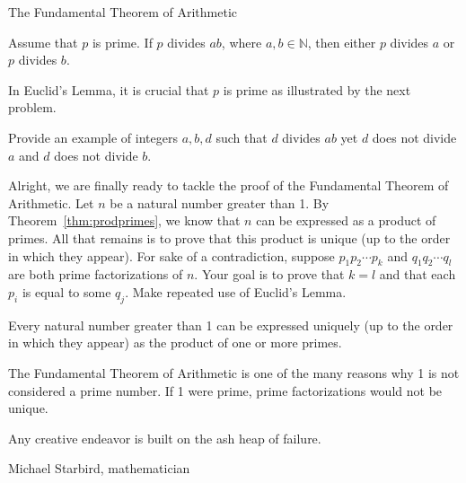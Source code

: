 \begin{section}{The Fundamental Theorem of Arithmetic}
\begin{theorem}\label{thm:Euclid}
Assume that $p$ is prime.  If $p$ divides $ab$, where $a,b\in\mathbb{N}$, then either $p$ divides $a$ or $p$ divides $b$.
\end{theorem}

In Euclid's Lemma, it is crucial that $p$ is prime as illustrated by the next problem.

\begin{problem}
Provide an example of integers $a, b, d$ such that $d$ divides $ab$ yet $d$ does not divide $a$ and $d$ does not divide $b$.
\end{problem}

Alright, we are finally ready to tackle the proof of the Fundamental Theorem of Arithmetic. Let $n$ be a natural number greater than 1. By Theorem~\ref{thm:prodprimes}, we know that $n$ can be expressed as a product of primes.  All that remains is to prove that this product is unique (up to the order in which they appear). For sake of a contradiction, suppose $p_1 p_2 \cdots p_k$ and $q_1 q_2 \cdots q_l$ are both prime factorizations of $n$.  Your goal is to prove that $k=l$ and that each $p_i$ is equal to some $q_j$. Make repeated use of Euclid's Lemma.

\begin{theorem}\label{thm:FTA}
Every natural number greater than 1 can be expressed uniquely (up to the order in which they appear) as the product of one or more primes.
\end{theorem}

The Fundamental Theorem of Arithmetic is one of the many reasons why 1 is not considered a prime number. If 1 were prime, prime factorizations would not be unique.

\epigraph{Any creative endeavor is built on the ash heap of failure.}{Michael Starbird, mathematician}

\end{section}